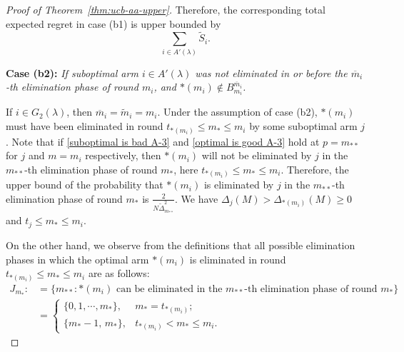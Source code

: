 \documentclass[11pt]{article}
\begin{document}
\begin{proof}[Proof of Theorem~\ref{thm:ucb-aa-upper}]
Therefore, the corresponding total expected regret in case (b1) is upper bounded by 
\[\sum_{i \in A'(\lambda)} \tilde{S}_i.\]

\textbf{Case (b2):}\textit{ If suboptimal arm \( i \in A'(\lambda) \) was not eliminated in or before the $\overline{m}_{i}$-th elimination phase of round $m_i$, and \( *(m_i) \notin B_{m_i}^{\overline{m}_i} \). }  

If $i\in G_2(\lambda)$, then $\overline{m}_i=\tilde{m}_i=m_i$. Under the assumption of case (b2), $*(m_i)$ must have been eliminated in round \( t_{*(m_i)} \leq m_* \leq m_i \) by some suboptimal arm \( j \). Note that if \eqref{suboptimal is bad A-3} and \eqref{optimal is good A-3} hold at \(p= m_{**} \) for $j$ and $m=m_i$ respectively, then \( *(m_i) \) will not be eliminated by \( j \) in the $m_{**}$-th elimination phase of round $m_*$, here $t_{*(m_i)}\leq m_*\leq m_i$. Therefore, the upper bound of the probability that \( *(m_i) \) is eliminated by \( j \) in the $m_{**}$-th elimination phase of round $m_*$ is \( \frac{2}{N \tilde{\Delta}_{m_{**}}^2} \). We have \( \Delta_j(M) > \Delta_{*(m_i)}(M) \geq 0 \) and \( t_j \leq m_* \leq m_i \). 

On the other hand, we observe from the definitions that all possible elimination phases in which the optimal arm $*(m_i)$ is eliminated in round $ t_{*(m_i)} \leq m_* \leq m_i $ are as follows:
\begin{align*}
    J_{m_*}:&=\{m_{**}:\text{$*(m_i)$ can be eliminated in the } m_{**} \text{-th elimination phase of round $m_*$}\}\\
    &=\begin{cases}
    \{0,1,\cdots, m_*\},& m_*=t_{*(m_i)};\\
    \{m_*-1,\, m_*\}, &t_{*(m_i)}<m_*\leq m_i.
\end{cases}
\end{align*}


\end{proof}
\end{document}
